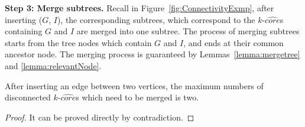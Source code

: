 


\textbf{Step 3: Merge subtrees.}
Recall in Figure~\ref{fig:ConnectivityExmp}, after inserting ($G$, $I$), the corresponding subtrees, which correspond to the $k$-$\widehat{core}$s containing $G$ and $I$ are merged into one subtree. The process of merging subtrees starts from the tree nodes which contain $G$ and $I$, and ends at their common ancestor node.
The merging process is guaranteed by Lemmas~\ref{lemma:mergetree} and \ref{lemma:relevantNode}.

\begin{lemma}
\label{lemma:mergetree}
After inserting an edge between two vertices, the maximum numbers of disconnected $k$-$\widehat{core}$s
which need to be merged is two.
\end{lemma}
\begin{proof}
It can be proved directly by contradiction.
\end{proof}

